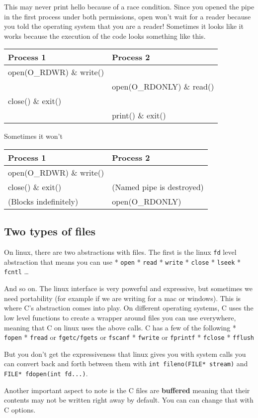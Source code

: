 This may never print hello because of a race condition. Since you opened
the pipe in the first process under both permissions, open won't wait
for a reader because you told the operating system that you are a
reader! Sometimes it looks like it works because the execution of the
code looks something like this.

\begin{longtable}[c]{@{}ll@{}}
\toprule
Process 1 & Process 2\tabularnewline
\midrule
\endhead
open(O\_RDWR) \& write() &\tabularnewline
& open(O\_RDONLY) \& read()\tabularnewline
close() \& exit() &\tabularnewline
& print() \& exit()\tabularnewline
\bottomrule
\end{longtable}

Sometimes it won't

\begin{longtable}[c]{@{}ll@{}}
\toprule
Process 1 & Process 2\tabularnewline
\midrule
\endhead
open(O\_RDWR) \& write() &\tabularnewline
close() \& exit() & (Named pipe is destroyed)\tabularnewline
(Blocks indefinitely) & open(O\_RDONLY)\tabularnewline
\bottomrule
\end{longtable}

\subsection{Two types of files}\label{two-types-of-files}

On linux, there are two abstractions with files. The first is the linux
\texttt{fd} level abstraction that means you can use * \texttt{open} *
\texttt{read} * \texttt{write} * \texttt{close} * \texttt{lseek} *
\texttt{fcntl} \ldots{}

And so on. The linux interface is very powerful and expressive, but
sometimes we need portability (for example if we are writing for a mac
or windows). This is where C's abstraction comes into play. On different
operating systems, C uses the low level functions to create a wrapper
around files you can use everywhere, meaning that C on linux uses the
above calls. C has a few of the following * \texttt{fopen} *
\texttt{fread} or \texttt{fgetc/fgets} or \texttt{fscanf} *
\texttt{fwrite} or \texttt{fprintf} * \texttt{fclose} * \texttt{fflush}

But you don't get the expressiveness that linux gives you with system
calls you can convert back and forth between them with
\texttt{int\ fileno(FILE*\ stream)} and
\texttt{FILE*\ fdopen(int\ fd...)}.

Another important aspect to note is the C files are \textbf{buffered}
meaning that their contents may not be written right away by default.
You can can change that with C options.

